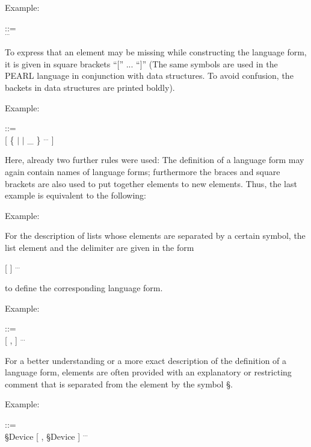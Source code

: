 Example:

 ::=\\
\x {} $^{...}$

To express that an element may be missing while constructing the
language form, it is given in square brackets ``['' ... ``]'' (The 
same symbols are used in the PEARL language in conjunction with data structures.
To avoid confusion, the backets in data structures are printed boldly).

Example:

 ::=\\
\x {} [ \{  $\mid$  $\mid$ \_ \} $^{...}$ ]

Here, already two further rules were used: The definition of a language
form may again contain names of language forms; furthermore the braces
and square brackets are also used to put together elements to new
elements. Thus, the last example is equivalent to the following:

Example:

\begin{grammarframe}

\end{grammarframe}


For the description of lists whose elements are separated by a certain
symbol, the list element and the delimiter are given in the form

 [   ] $^{...}$

to define the corresponding language form.

Example:

 ::=\\
\x {} [ ,  ] $^{...}$

For a better understanding or a more exact description of the definition
of a language form, elements are often provided with an explanatory or
restricting comment that is separated from the element by the symbol
\S .

Example:

 ::=\\
\x {}\S  Device [ , \S Device ] $^{...}$

